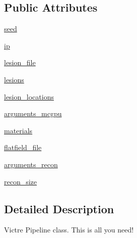 \subsection*{Public Attributes}
\begin{DoxyCompactItemize}
\item 
\hyperlink{classVictre_1_1Pipeline_1_1Pipeline_aa252e7c9269262d7c97deb49112caef3}{seed}
\item 
\hyperlink{classVictre_1_1Pipeline_1_1Pipeline_a43757d24ebee55a97ad659c6e0cb27ad}{ip}
\item 
\hyperlink{classVictre_1_1Pipeline_1_1Pipeline_a7cbcebfc89ab01d7c2f51cfd39ea3dae}{lesion\-\_\-file}
\item 
\hyperlink{classVictre_1_1Pipeline_1_1Pipeline_acf86f8174c970edae18400315e841c16}{lesions}
\item 
\hyperlink{classVictre_1_1Pipeline_1_1Pipeline_a0fb31f166001c15f1a20349d4679e9a3}{lesion\-\_\-locations}
\item 
\hyperlink{classVictre_1_1Pipeline_1_1Pipeline_a9b64bd35b445bbdf6732b7567910e567}{arguments\-\_\-mcgpu}
\item 
\hyperlink{classVictre_1_1Pipeline_1_1Pipeline_a8b81342be465b5c99ba7da997fc6fd5c}{materials}
\item 
\hyperlink{classVictre_1_1Pipeline_1_1Pipeline_abcb9cb7ffcd4a4a69dccf0fb2ca03d54}{flatfield\-\_\-file}
\item 
\hyperlink{classVictre_1_1Pipeline_1_1Pipeline_a19f258798c13c0a6fdbe9c2d09f1b026}{arguments\-\_\-recon}
\item 
\hyperlink{classVictre_1_1Pipeline_1_1Pipeline_a17245decfa597e911b0c12be88a3fb96}{recon\-\_\-size}
\end{DoxyCompactItemize}


\subsection{Detailed Description}
\begin{DoxyVerb}Victre Pipeline class. This is all you need!
\end{DoxyVerb}
 

